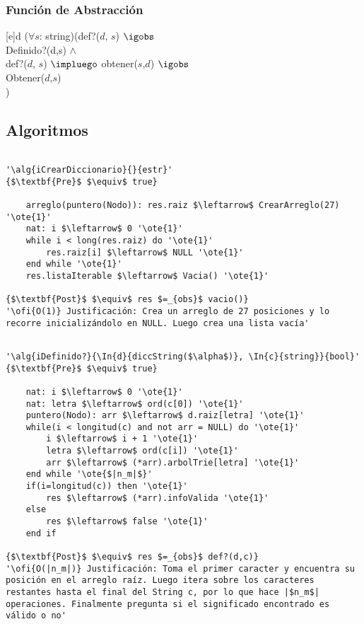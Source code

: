 
\pagebreak

\subsubsection{Funci\'on de Abstracci\'on}

[e]{d}{
($\forall s$: string)(def?($d$, $s$) $\igobs$ \\ Definido?(d,s)
\- $\land$ \\
\- def?($d$, $s$) $\impluego$ obtener($s$,$d$) $\igobs$ \\
\- Obtener($d$,$s$) \\
)
}

\subsection{Algoritmos}

\lstset{style=alg}

\begin{lstlisting}[mathescape]

'\alg{iCrearDiccionario}{}{estr}'
{$\textbf{Pre}$ $\equiv$ true}
	
    arreglo(puntero(Nodo)): res.raiz $\leftarrow$ CrearArreglo(27) '\ote{1}'
	nat: i $\leftarrow$ 0 '\ote{1}' 
    while i < long(res.raiz) do '\ote{1}'
    	res.raiz[i] $\leftarrow$ NULL '\ote{1}'
    end while '\ote{1}'
    res.listaIterable $\leftarrow$ Vacia() '\ote{1}'

{$\textbf{Post}$ $\equiv$ res $=_{obs}$ vacio()}
'\ofi{O(1)} Justificación: Crea un arreglo de 27 posiciones y lo recorre inicializándolo en NULL. Luego crea una lista vacía'

\end{lstlisting}

\begin{lstlisting}[mathescape]

'\alg{iDefinido?}{\In{d}{diccString($\alpha$)}, \In{c}{string}}{bool}'
{$\textbf{Pre}$ $\equiv$ true}

	nat: i $\leftarrow$ 0 '\ote{1}'
	nat: letra $\leftarrow$ ord(c[0]) '\ote{1}'
	puntero(Nodo): arr $\leftarrow$ d.raiz[letra] '\ote{1}'
	while(i < longitud(c) and not arr = NULL) do '\ote{1}'
		i $\leftarrow$ i + 1 '\ote{1}'
		letra $\leftarrow$ ord(c[i]) '\ote{1}'
		arr $\leftarrow$ (*arr).arbolTrie[letra] '\ote{1}'
	end while '\ote{$|n_m|$}'
	if(i=longitud(c)) then '\ote{1}'
		res $\leftarrow$ (*arr).infoValida '\ote{1}'
	else
		res $\leftarrow$ false '\ote{1}'
	end if

{$\textbf{Post}$ $\equiv$ res $=_{obs}$ def?(d,c)}	
'\ofi{O(|n_m|)} Justificación: Toma el primer caracter y encuentra su posición en el arreglo raíz. Luego itera sobre los caracteres restantes hasta el final del String c, por lo que hace |$n_m$| operaciones. Finalmente pregunta si el significado encontrado es válido o no'

\end{lstlisting}

